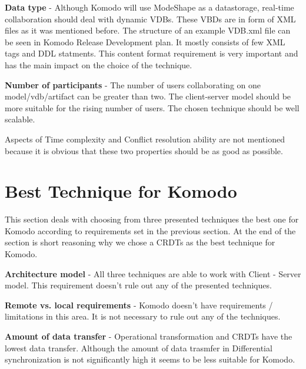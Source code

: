 \documentclass[12pt,oneside]{fithesis2}
\begin{document}
\textbf{Data type} - Although Komodo will use ModeShape as a datastorage, real-time collaboration should deal with dynamic VDBs. These VBDs are in form of XML files as it was mentioned before. The structure of an example VDB.xml file can be seen in Komodo Release Development plan\cite{Komodo}. It mostly consists of few XML tags and DDL statments. This content format requirement is very important and has the main impact on the choice of the technique.

\vspace{3mm} 

\textbf{Number of participants} - The number of users collaborating on one model/vdb/artifact can be greater than two. The client-server model should be more suitable for the rising number of users. The chosen technique should be well scalable.

\vspace{3mm} 

\par Aspects of Time complexity and Conflict resolution ability are not mentioned because it is obvious that these two properties should be as good as possible.
\section{Best Technique for Komodo} \label{best}
\par This section deals with choosing from three presented techniques the best one for Komodo according to requirements set in the previous section. At the end of the section is short reasoning why we chose a CRDTs as the best technique for Komodo. 

\vspace{3mm} 

\textbf{Architecture model} - All three techniques are able to work with Client - Server model. This requirement doesn't rule out any of the presented techniques.

\vspace{3mm} 

\textbf{Remote vs. local requirements} - Komodo doesn't have requirements / limitations in this area. It is not necessary to rule out any of the techniques.

\vspace{3mm} 

\textbf{Amount of data transfer} - Operational transformation and CRDTs have the lowest data transfer. Although the amount of data trasmfer in Differential synchronization is not significantly high it seems to be less suitable for Komodo.	
\end{document}
